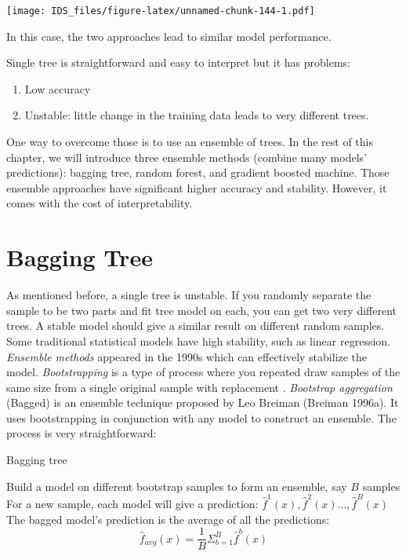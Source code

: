 \documentclass[12pt,]{krantz}
\providecommand{\tightlist}{%
  \setlength{\itemsep}{0pt}\setlength{\parskip}{0pt}}
\begin{document}
\texttt{[image: IDS\_files/figure-latex/unnamed-chunk-144-1.pdf]}

In this case, the two approaches lead to similar model performance.

Single tree is straightforward and easy to interpret but it has problems:

\begin{enumerate}
\def\labelenumi{\arabic{enumi}.}
\tightlist
\item
  Low accuracy
\item
  Unstable: little change in the training data leads to very different trees.
\end{enumerate}

One way to overcome those is to use an ensemble of trees. In the rest of this chapter, we will introduce three ensemble methods (combine many models' predictions): bagging tree, random forest, and gradient boosted machine. Those ensemble approaches have significant higher accuracy and stability. However, it comes with the cost of interpretability.

\hypertarget{bagging-tree}{%
\section{Bagging Tree}\label{bagging-tree}}

As mentioned before, a single tree is unstable. If you randomly separate the sample to be two parts and fit tree model on each, you can get two very different trees. A stable model should give a similar result on different random samples. Some traditional statistical models have high stability, such as linear regression. \emph{Ensemble methods} appeared in the 1990s which can effectively stabilize the model. \emph{Bootstrapping} is a type of process where you repeated draw samples of the same size from a single original sample with replacement \citep{Efron1986}. \emph{Bootstrap aggregation} (Bagged) is an ensemble technique proposed by Leo Breiman (Breiman 1996a). It uses bootstrapping in conjunction with any model to construct an ensemble. The process is very straightforward:

\begin{algorithm}
\caption{Bagging tree}\label{baggingtreealgorithm} 
\begin{algorithmic}[1] 
\State Build a model on different bootstrap samples to form an ensemble, say $B$ samples
\State For a new sample, each model will give a prediction: $\hat{f}^1(x),\hat{f}^2(x)\dots,\hat{f}^B(x)$
\State The bagged model's prediction is the average of all the predictions: $$\hat{f}_{avg}(x)=\frac{1}{B}\Sigma^B_{b=1}\hat{f}^b(x)$$
\end{algorithmic}
\end{algorithm}
\end{document}
